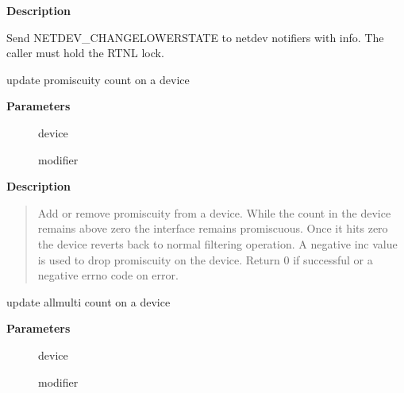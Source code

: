 \documentclass[a4paper,8pt,english]{sphinxmanual}
\begin{document}
\textbf{Description}

Send NETDEV\_CHANGELOWERSTATE to netdev notifiers with info.
The caller must hold the RTNL lock.

\begin{fulllineitems}
\label{networking/kapi:c.dev_set_promiscuity}
update promiscuity count on a device

\end{fulllineitems}


\textbf{Parameters}
\begin{description}
\item[{}] \leavevmode
device

\item[{}] \leavevmode
modifier

\end{description}

\textbf{Description}
\begin{quote}

Add or remove promiscuity from a device. While the count in the device
remains above zero the interface remains promiscuous. Once it hits zero
the device reverts back to normal filtering operation. A negative inc
value is used to drop promiscuity on the device.
Return 0 if successful or a negative errno code on error.
\end{quote}

\begin{fulllineitems}
\label{networking/kapi:c.dev_set_allmulti}
update allmulti count on a device

\end{fulllineitems}


\textbf{Parameters}
\begin{description}
\item[{}] \leavevmode
device

\item[{}] \leavevmode
modifier

\end{description}
\end{document}
